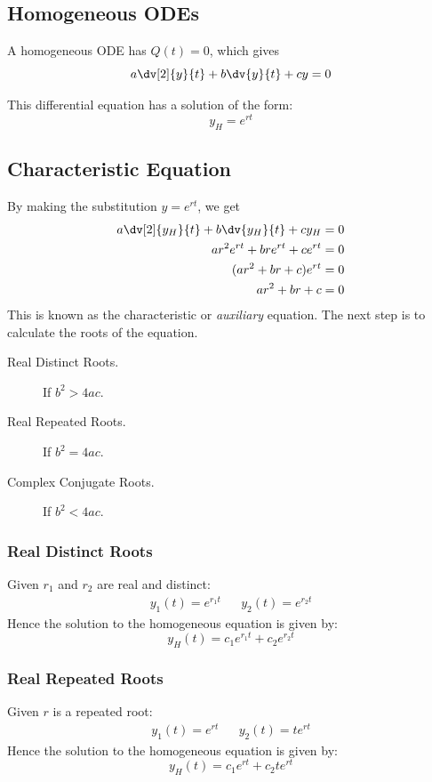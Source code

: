 \documentclass{article}
\begin{document}
\subsection{Homogeneous ODEs}
\begin{definition}
    A homogeneous ODE has \(Q(t)=0\), which gives
    \begin{equation*}
        a \dv[2]{y}{t} + b \dv{y}{t} + c y = 0
    \end{equation*}
\end{definition}
This differential equation has a solution of the form:
\begin{equation*}
    y_H = e^{rt}
\end{equation*}
\subsection{Characteristic Equation}
By making the substitution \(y=e^{rt}\), we get
\begin{align*}
    a \dv[2]{y_H}{t} + b \dv{y_H}{t} + c y_H & = 0 \\
    ar^2e^{rt} + bre^{rt} + ce^{rt}          & = 0 \\
    (ar^2 + br + c)e^{rt}                    & = 0 \\
    ar^2 + br + c                            & = 0
\end{align*}
This is known as the characteristic or \textit{auxiliary} equation. The next step is to calculate the roots of the equation.
\begin{description}
    \item[Real Distinct Roots.] If \(b^2 > 4ac\).
    \item[Real Repeated Roots.] If \(b^2 = 4ac\).
    \item[Complex Conjugate Roots.] If \(b^2 < 4ac\).
\end{description}
\subsubsection{Real Distinct Roots}
Given \(r_1\) and \(r_2\) are real and distinct:
\begin{align*}
    y_1(t) = e^{r_1t} &  & y_2(t) = e^{r_2t}
\end{align*}
Hence the solution to the homogeneous equation is given by:
\begin{equation*}
    y_H(t) = c_1e^{r_1t} + c_2e^{r_2t}
\end{equation*}
\subsubsection{Real Repeated Roots}
Given \(r\) is a repeated root:
\begin{align*}
    y_1(t) = e^{rt} &  & y_2(t) = te^{rt}
\end{align*}
Hence the solution to the homogeneous equation is given by:
\begin{equation*}
    y_H(t) = c_1e^{rt} + c_2te^{rt}
\end{equation*}
\end{document}
